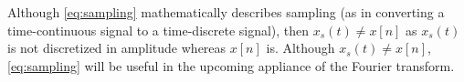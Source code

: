 Although \eqref{eq:sampling} mathematically describes sampling (as in converting a time-continuous signal to a time-discrete signal), then $x_s(t) \neq x[n]$ as $x_s(t)$ is not discretized in amplitude whereas $x[n]$ is. Although $x_s(t) \neq x[n]$, \eqref{eq:sampling} will be useful in the upcoming appliance of the Fourier transform.
